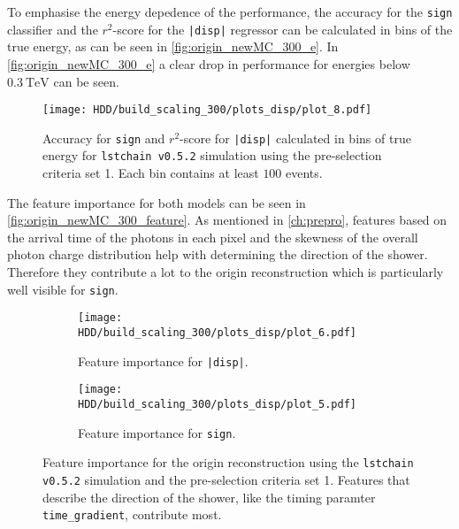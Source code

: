 To emphasise the energy depedence of the performance, the accuracy for the \texttt{sign} classifier and the $r^2$-score for the \texttt{|disp|} regressor can
be calculated in bins of the true energy, as can be seen in \autoref{fig:origin_newMC_300_e}.
In \autoref{fig:origin_newMC_300_e} a clear drop in performance for energies below $\SI{0.3}{\tera\electronvolt}$ can be seen.
\begin{figure}
    \centering
    \texttt{[image: HDD/build\_scaling\_300/plots\_disp/plot\_8.pdf]}
    \caption{Accuracy for \texttt{sign} and $r^2$-score for \texttt{|disp|} calculated in bins of true energy for 
        \texttt{lstchain v0.5.2} simulation using the pre-selection criteria set 1.
        Each bin contains at least $\num{100}$ events.
    }
    \label{fig:origin_newMC_300_e}
\end{figure}

The feature importance for both models can be seen in \autoref{fig:origin_newMC_300_feature}.
As mentioned in \autoref{ch:prepro}, features based on the arrival time of the photons in each pixel and the skewness of the overall photon charge distribution
help with determining the direction of the shower.
Therefore they contribute a lot to the origin reconstruction which is particularly well visible for \texttt{sign}.
\begin{figure}
    \centering
    \begin{subfigure}{0.49\textwidth}
        \centering
        \texttt{[image: HDD/build\_scaling\_300/plots\_disp/plot\_6.pdf]}
        \caption{Feature importance for \texttt{|disp|}.}
    \end{subfigure}
    \hfill
    \begin{subfigure}{0.49\textwidth}
        \centering
        \texttt{[image: HDD/build\_scaling\_300/plots\_disp/plot\_5.pdf]}
        \caption{Feature importance for \texttt{sign}.}
    \end{subfigure}
    \caption{Feature importance for the origin reconstruction using the \texttt{lstchain v0.5.2} simulation and the pre-selection criteria set 1.
        Features that describe the direction of the shower, like the timing paramter \texttt{time\_gradient}, contribute most.
    }
    \label{fig:origin_newMC_300_feature}
\end{figure}

